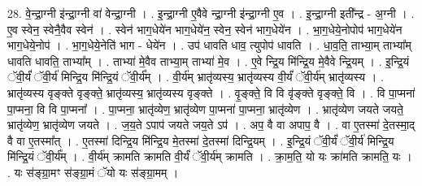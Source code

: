 \documentclass[17pt]{extarticle}
\begin{document}
28. वे॒न्द्रा॒ग्नी इ॑न्द्रा॒ग्नी वा॑ वेन्द्रा॒ग्नी । . इ॒न्द्रा॒ग्नी ए॒वैवे न्द्रा॒ग्नी इ॑न्द्रा॒ग्नी ए॒व । . इ॒न्द्रा॒ग्नी इती᳚न्द्र - अ॒ग्नी । . ए॒व स्वेन॒ स्वेनै॒वैव स्वेन॑ । . स्वेन॑ भाग॒धेये॑न भाग॒धेये॑न॒ स्वेन॒ स्वेन॑ भाग॒धेये॑न । . भा॒ग॒धेये॒नोपोप॑ भाग॒धेये॑न भाग॒धेये॒नोप॑ । . भा॒ग॒धेये॒नेति॑ भाग - धेये॑न । . उप॑ धावति धाव॒ त्युपोप॑ धावति । . धा॒व॒ति॒ ताभ्या॒म् ताभ्या᳚म् धावति धावति॒ ताभ्या᳚म् । . ताभ्या॑ मे॒वैव ताभ्या॒म् ताभ्या॑ मे॒व । . ए॒वे न्द्रि॒य मि॑न्द्रि॒य मे॒वैवे न्द्रि॒यम् । . इ॒न्द्रि॒यं ॅवी॒र्यं॑ ॅवी॒र्य॑ मिन्द्रि॒य मि॑न्द्रि॒यं ॅवी॒र्य᳚म् । . वी॒र्य॑म् भ्रातृ॑व्यस्य॒ भ्रातृ॑व्यस्य वी॒र्यं॑ ॅवी॒र्य॑म् भ्रातृ॑व्यस्य । . भ्रातृ॑व्यस्य वृङ्क्ते वृङ्क्ते॒ भ्रातृ॑व्यस्य॒ भ्रातृ॑व्यस्य वृङ्क्ते । . वृ॒ङ्क्ते॒ वि वि वृ॑ङ्क्ते वृङ्क्ते॒ वि । . वि पा॒प्मना॑ पा॒प्मना॒ वि वि पा॒प्मना᳚ । . पा॒प्मना॒ भ्रातृ॑व्येण॒ भ्रातृ॑व्येण पा॒प्मना॑ पा॒प्मना॒ भ्रातृ॑व्येण । . भ्रातृ॑व्येण जयते जयते॒ भ्रातृ॑व्येण॒ भ्रातृ॑व्येण जयते । . ज॒य॒ते ऽपाप॑ जयते जय॒ते ऽप॑ । . अप॒ वै वा अपाप॒ वै । . वा ए॒तस्मा॑ दे॒तस्मा॒द् वै वा ए॒तस्मा᳚त् । . ए॒तस्मा॑ दिन्द्रि॒य मि॑न्द्रि॒य मे॒तस्मा॑ दे॒तस्मा॑ दिन्द्रि॒यम् । . इ॒न्द्रि॒यं ॅवी॒र्यं॑ ॅवी॒र्य॑ मिन्द्रि॒य मि॑न्द्रि॒यं ॅवी॒र्य᳚म् । . वी॒र्य॑म् क्रामति क्रामति वी॒र्यं॑ ॅवी॒र्य॑म् क्रामति । . क्रा॒म॒ति॒ यो यः क्रा॑मति क्रामति॒ यः । . यः स॑ङ्ग्रा॒मꣳ स॑ङ्ग्रा॒मं ॅयो यः स॑ङ्ग्रा॒मम् । \newline
\end{document}
